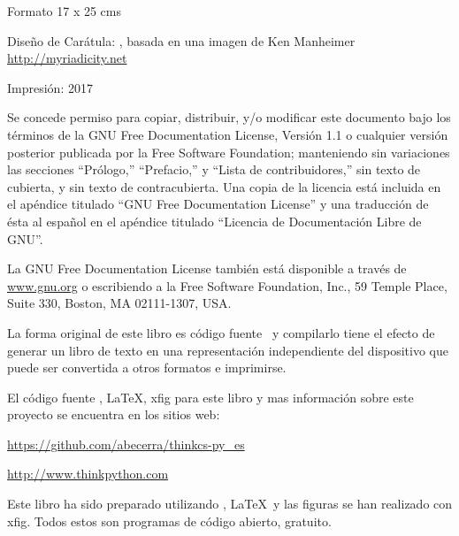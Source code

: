 {\scriptsize{}Formato 17 x 25 cms}\\
{\scriptsize{} %

{\scriptsize{}Diseño de Carátula: , basada en una imagen de Ken Manheimer
}\\
{\scriptsize{}\url{ http://myriadicity.net}}{\scriptsize \par}

{\scriptsize{}Impresión: 2017} \newpage{}

\thispagestyle{empty} \vspace{0.25in}

Se concede permiso para copiar, distribuir, y/o modificar este documento
bajo los términos de la GNU Free Documentation License, Versión 1.1
o cualquier versión posterior publicada por la Free Software Foundation;
manteniendo sin variaciones las secciones ``Prólogo,'' ``Prefacio,''
y ``Lista de contribuidores,'' sin texto de cubierta, y sin texto
de contracubierta. Una copia de la licencia está incluida en el apéndice
titulado ``GNU Free Documentation License'' y una traducción de
ésta al español en el apéndice titulado ``Licencia de Documentación
Libre de GNU''.

La GNU Free Documentation License también está disponible a través
de \url{www.gnu.org} o escribiendo a la Free Software Foundation,
Inc., 59 Temple Place, Suite 330, Boston, MA 02111-1307, USA.

La forma original de este libro es código fuente \LyX{}\ y compilarlo
tiene el efecto de generar un libro de texto en una representación
independiente del dispositivo que puede ser convertida a otros formatos
e imprimirse.

El código fuente \LyX{}, \LaTeX{}, xfig para este libro y mas información
sobre este proyecto se encuentra en los sitios web:

\url{https://github.com/abecerra/thinkcs-py_es}

\url{   http://www.thinkpython.com}

Este libro ha sido preparado utilizando \LyX{}, \LaTeX{}\ y las
figuras se han realizado con xfig. Todos estos son programas de código
abierto, gratuito.

\vspace{0.25in}

\newpage{}

\thispagestyle{empty}

}
